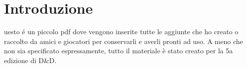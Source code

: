\chapter{Introduzione}

uesto é un piccolo pdf dove vengono inserite tutte le aggiunte che ho creato o raccolto da amici e giocatori per conservarli e averli pronti ad uso. A meno che non sia specificato espressamente, tutto il materiale è stato creato per la 5a edizione di D\&D.
